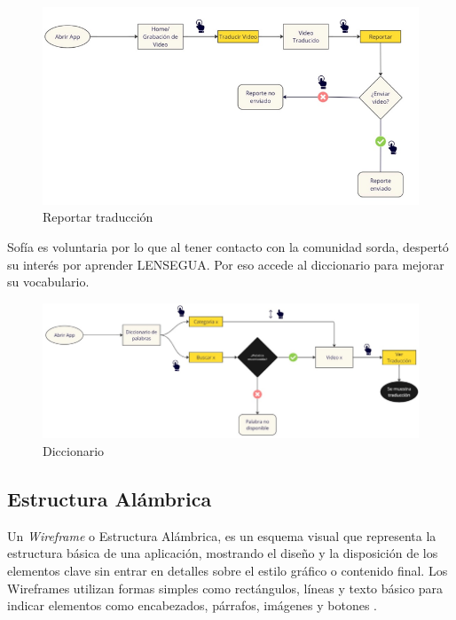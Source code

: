 \begin{figure} [H]
    \centering
    \includegraphics[width=1\linewidth]{figuras/flujo_usuario7.png}
    \caption{Reportar traducción}
    \label{fig:enter-label}
\end{figure}


Sofía es voluntaria por lo que al tener contacto con la comunidad sorda, despertó su interés por aprender LENSEGUA. Por eso accede al diccionario para mejorar su vocabulario. 


\begin{figure} [H]
    \centering
    \includegraphics[width=1\linewidth]{figuras/flujo_usuario8.png}
    \caption{Diccionario}
    \label{fig:enter-label}
\end{figure}



\subsection{Estructura Alámbrica}

Un \textit{Wireframe} o Estructura Alámbrica, es un esquema visual que representa la estructura básica de una aplicación, mostrando el diseño y la disposición de los elementos clave sin entrar en detalles sobre el estilo gráfico o contenido final. Los Wireframes utilizan formas simples como rectángulos, líneas y texto básico para indicar elementos como encabezados, párrafos, imágenes y botones \cite{Rees2024}.

